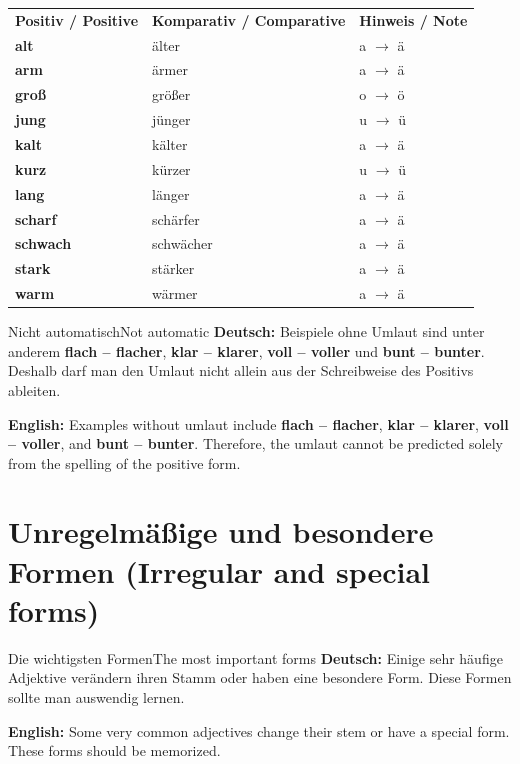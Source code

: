 \documentclass[a4paper,11pt]{article}
\newcommand{\GermanText}[1]{\textbf{Deutsch: }#1\par}
\newcommand{\EnglishText}[1]{{\small\color{SoftGray}\textbf{English: }#1\par}}
\begin{document}
      \begin{longtable}{>{\bfseries}p{3.3cm}|p{3.5cm}|p{6.5cm}}
         \rowcolor{HeaderBlueDark}
         \color{white}\textbf{Positiv / Positive} &
         \color{white}\textbf{Komparativ / Comparative} &
         \color{white}\textbf{Hinweis / Note} \\
         alt & älter & a $\rightarrow$ ä \\
         arm & ärmer & a $\rightarrow$ ä \\
         groß & größer & o $\rightarrow$ ö \\
         jung & jünger & u $\rightarrow$ ü \\
         kalt & kälter & a $\rightarrow$ ä \\
         kurz & kürzer & u $\rightarrow$ ü \\
         lang & länger & a $\rightarrow$ ä \\
         scharf & schärfer & a $\rightarrow$ ä \\
         schwach & schwächer & a $\rightarrow$ ä \\
         stark & stärker & a $\rightarrow$ ä \\
         warm & wärmer & a $\rightarrow$ ä \\
      \end{longtable}

      \begin{grammarentry}{Nicht automatisch}{Not automatic}
         \GermanText{Beispiele ohne Umlaut sind unter anderem \textbf{flach -- flacher}, \textbf{klar -- klarer}, \textbf{voll -- voller} und \textbf{bunt -- bunter}. Deshalb darf man den Umlaut nicht allein aus der Schreibweise des Positivs ableiten.}
         \EnglishText{Examples without umlaut include \textbf{flach -- flacher}, \textbf{klar -- klarer}, \textbf{voll -- voller}, and \textbf{bunt -- bunter}. Therefore, the umlaut cannot be predicted solely from the spelling of the positive form.}
      \end{grammarentry}

   \section{Unregelmäßige und besondere Formen \textnormal{(Irregular and special forms)}}

      \begin{grammarentry}{Die wichtigsten Formen}{The most important forms}
         \GermanText{Einige sehr häufige Adjektive verändern ihren Stamm oder haben eine besondere Form. Diese Formen sollte man auswendig lernen.}
         \EnglishText{Some very common adjectives change their stem or have a special form. These forms should be memorized.}
      \end{grammarentry}
\end{document}
